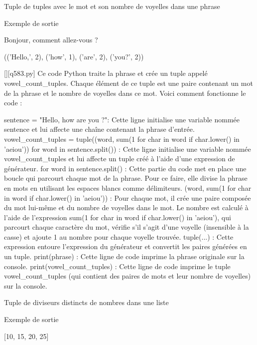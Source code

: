        \question
        Tuple de tuples avec le mot et son nombre de voyelles dans une phrase

Exemple de sortie

Bonjour, comment allez-vous ?

(('Hello,', 2), ('how', 1), ('are', 2), ('you?', 2))
        \par
        \begin{solution}
            \renewcommand{\nomfichier}{q583.py}
            \pythonfile{\chemincode \nomfichier}[][\nomfichier]
            Ce code Python traite la phrase et crée un tuple appelé vowel\_count\_tuples. Chaque élément de ce tuple est une paire contenant un mot de la phrase et le nombre de voyelles dans ce mot. Voici comment fonctionne le code :

    sentence = "Hello, how are you ?": Cette ligne initialise une variable nommée sentence et lui affecte une chaîne contenant la phrase d'entrée.
    vowel\_count\_tuples = tuple((word, sum(1 for char in word if char.lower() in 'aeiou')) for word in sentence.split()) : Cette ligne initialise une variable nommée vowel\_count\_tuples et lui affecte un tuple créé à l'aide d'une expression de générateur.
        for word in sentence.split() : Cette partie du code met en place une boucle qui parcourt chaque mot de la phrase. Pour ce faire, elle divise la phrase en mots en utilisant les espaces blancs comme délimiteurs.
        (word, sum(1 for char in word if char.lower() in 'aeiou')) : Pour chaque mot, il crée une paire composée du mot lui-même et du nombre de voyelles dans le mot. Le nombre est calculé à l'aide de l'expression sum(1 for char in word if char.lower() in 'aeiou'), qui parcourt chaque caractère du mot, vérifie s'il s'agit d'une voyelle (insensible à la casse) et ajoute 1 au nombre pour chaque voyelle trouvée.
        tuple(...) : Cette expression entoure l'expression du générateur et convertit les paires générées en un tuple.
    print(phrase) : Cette ligne de code imprime la phrase originale sur la console.
    print(vowel\_count\_tuples) : Cette ligne de code imprime le tuple vowel\_count\_tuples (qui contient des paires de mots et leur nombre de voyelles) sur la console.
        \end{solution}
        

        \question
        Tuple de diviseurs distincts de nombres dans une liste

Exemple de sortie

[10, 15, 20, 25]

